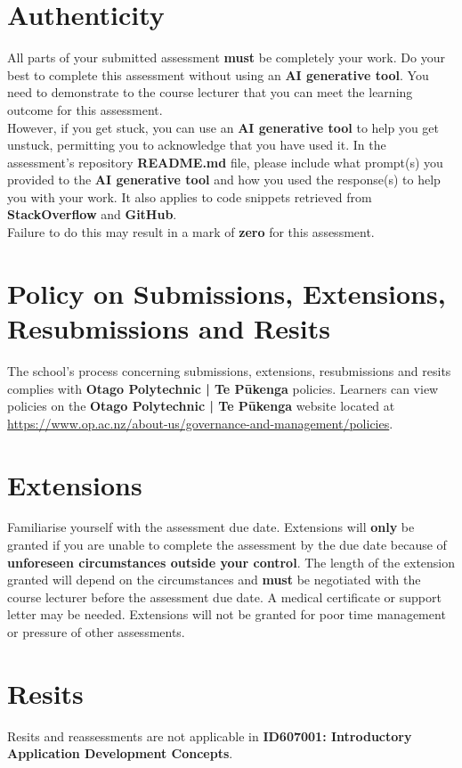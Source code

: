 \documentclass{article}
\begin{document}
\section*{Authenticity}
All parts of your submitted assessment \textbf{must} be completely your work. Do your best to complete this assessment without using an \textbf{AI generative tool}. You need to demonstrate to the course lecturer that you can meet the learning outcome for this assessment. \\
 
 However, if you get stuck, you can use an \textbf{AI generative tool} to help you get unstuck, permitting you to acknowledge that you have used it. In the assessment's repository \textbf{README.md} file, please include what prompt(s) you provided to the \textbf{AI generative tool} and how you used the response(s) to help you with your work. It also applies to code snippets retrieved from \textbf{StackOverflow} and \textbf{GitHub}. \\
 
 Failure to do this may result in a mark of \textbf{zero} for this assessment.

\section*{Policy on Submissions, Extensions, Resubmissions and Resits}
The school's process concerning submissions, extensions, resubmissions and resits complies with \textbf{Otago Polytechnic | Te Pūkenga} policies. Learners can view policies on the \textbf{Otago Polytechnic | Te Pūkenga} website located at \href{https://www.op.ac.nz/about-us/governance-and-management/policies}{https://www.op.ac.nz/about-us/governance-and-management/policies}. 

\section*{Extensions}
Familiarise yourself with the assessment due date. Extensions will \textbf{only} be granted if you are unable to complete the assessment by the due date because of \textbf{unforeseen circumstances outside your control}. The length of the extension granted will depend on the circumstances and \textbf{must} be negotiated with the course lecturer before the assessment due date. A medical certificate or support letter may be needed. Extensions will not be granted for poor time management or pressure of other assessments.

\section*{Resits}
Resits and reassessments are not applicable in \textbf{ID607001: Introductory Application Development Concepts}. 
\end{document}
